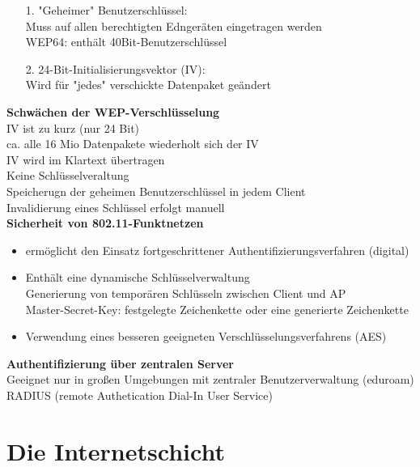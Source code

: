 \documentclass{scrreprt}
\begin{document}
\begin{itemize}
	\item [1.] "Geheimer" Benutzerschlüssel:
	\\Muss auf allen berechtigten Edngeräten eingetragen werden
	\\WEP64: enthält 40Bit-Benutzerschlüssel
	\item [2.] 24-Bit-Initialisierungsvektor (IV):
	\\Wird für "jedes" verschickte Datenpaket geändert
\end{itemize}
\textbf{Schwächen der WEP-Verschlüsselung}
\\IV ist zu kurz (nur 24 Bit)
\\\tab ca. alle 16 Mio Datenpakete wiederholt sich der IV
\\\tab IV wird im Klartext übertragen
\\Keine Schlüsselveraltung
\\\tab Speicherugn der geheimen Benutzerschlüssel in jedem Client
\\\tab Invalidierung eines Schlüssel erfolgt manuell
\\\textbf{Sicherheit von 802.11-Funktnetzen}
\begin{itemize}
	\item ermöglicht den Einsatz fortgeschrittener Authentifizierungsverfahren (digital)
	\item Enthält eine dynamische Schlüsselverwaltung
	\\\tab Generierung von temporären Schlüsseln zwischen Client und AP 
	\\\tab Master-Secret-Key: festgelegte Zeichenkette oder eine generierte Zeichenkette
	\item Verwendung eines besseren geeigneten Verschlüsselungsverfahrens (AES)
\end{itemize}
\textbf{Authentifizierung über zentralen Server}
\\\tab Geeignet nur in großen Umgebungen mit zentraler Benutzerverwaltung (eduroam)
\\\tab RADIUS (remote Authetication Dial-In User Service)
\pagebreak
\chapter{Die Internetschicht}
\end{document}
